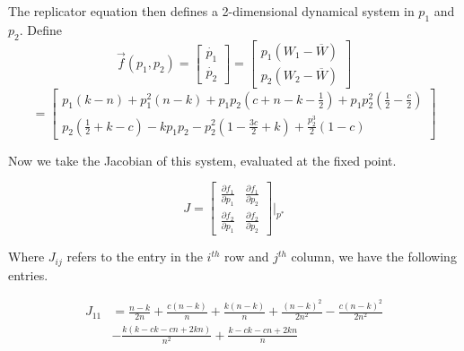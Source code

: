 
The replicator equation then defines a 2-dimensional dynamical system in $p_1$ and $p_2$. Define
 $$\vec{f}(p_1,p_2) =
 {\begin{bmatrix} 
\dot{p_1}\\
 \dot{p_2} 
\end{bmatrix}} =
{\begin{bmatrix} p_1 (W_1-\overline{W})\\
p_2 (W_2 - \overline{W}) %
\end{bmatrix}}$$
$$ = {\begin{bmatrix}
\displaystyle{p_1(k-n) + p_1^2 (n - k) + p_1 p_2(c + n - k - \frac{1}{2}) + p_1 p_2^2 (\frac{1}{2} - \frac{c}{2})}\\
\displaystyle{p_2(\frac{1}{2} + k - c) - k p_1 p_2 - p_2^2(1 - \frac{3 c}{2} + k) + \frac{p_2^3}{2} ( 1- c)}
\end{bmatrix}}$$

Now we take the Jacobian of this system, evaluated at the fixed point.

$$ J = {\begin{bmatrix}
\displaystyle{\frac{\partial{f_1}}{\partial{p_1}}} & \displaystyle{\frac{\partial{f_1}}{\partial{p_2}}} \\
\displaystyle{\frac{\partial{f_2}}{\partial{p_1}}} & 
\displaystyle{\frac{\partial{f_2}}{\partial{p_2}}}
\end{bmatrix}}\bigg|_{p^*}$$
	


Where $J_{ij}$ refers to the entry in the $i^{th}$ row and $j^{th}$ column, we have the following entries.

\begin{equation}
\label{J11}
\begin{split}
J_{11} &= \frac{n-k}{2 n} + \frac{c (n-k)}{n} + \frac{k(n-k)}{n} + \frac{(n-k)^2}{2 n^2} - \frac{c (n-k)^2}{2 n^2}\\
& - \frac{k (k - c k - c n + 2 k n)}{n^2} + \frac{k - c k - c n + 2 k n}{n}
\end{split}
\end{equation}


